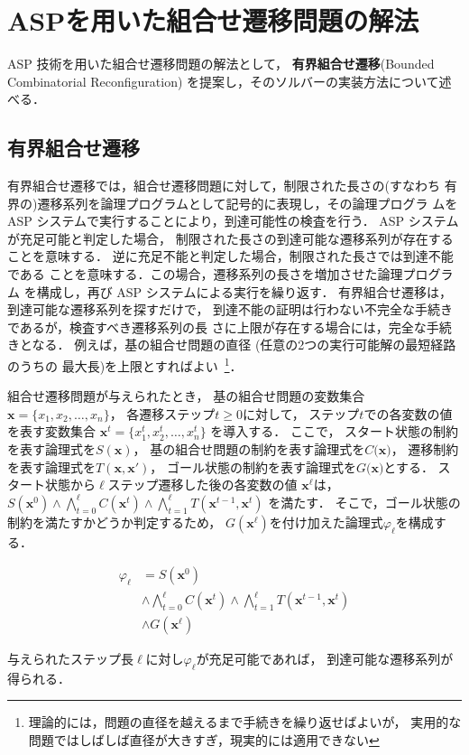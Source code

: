 ﻿%
\section{ASPを用いた組合せ遷移問題の解法}\label{chap:proposal}

ASP 技術を用いた組合せ遷移問題の解法として，
\textbf{有界組合せ遷移}(Bounded Combinatorial Reconfiguration)
を提案し，そのソルバーの実装方法について述べる．

\subsection{有界組合せ遷移}

有界組合せ遷移では，組合せ遷移問題に対して，制限された長さの(すなわち
有界の)遷移系列を論理プログラムとして記号的に表現し，その論理プログラ
ムを ASP システムで実行することにより，到達可能性の検査を行う．
ASP システムが充足可能と判定した場合，
制限された長さの到達可能な遷移系列が存在することを意味する．
逆に充足不能と判定した場合，制限された長さでは到達不能である
ことを意味する．この場合，遷移系列の長さを増加させた論理プログラム
を構成し，再び ASP システムによる実行を繰り返す．
有界組合せ遷移は，到達可能な遷移系列を探すだけで，
到達不能の証明は行わない不完全な手続きであるが，検査すべき遷移系列の長
さに上限が存在する場合には，完全な手続きとなる．
例えば，基の組合せ問題の直径 (任意の2つの実行可能解の最短経路のうちの
最大長)を上限とすればよい~\footnote{%
理論的には，問題の直径を越えるまで手続きを繰り返せばよいが，
実用的な問題ではしばしば直径が大きすぎ，現実的には適用できない}．

組合せ遷移問題が与えられたとき，
基の組合せ問題の変数集合
$\bm{x} = \{x_1,x_2,\ldots,x_n\}$，
各遷移ステップ$t\geq 0$に対して，
ステップ$t$での各変数の値を表す変数集合
$\bm{x}^{t} = \{x_1^t,x_2^t,\ldots,x_n^t\}$
を導入する．
ここで，
スタート状態の制約を表す論理式を$S(\bm{x})$，
基の組合せ問題の制約を表す論理式を$C(\bm{x)}$，
遷移制約を表す論理式を$T(\bm{x},\bm{x}')$，
ゴール状態の制約を表す論理式を$G(\bm{x)}$とする．
スタート状態から$\ell$ステップ遷移した後の各変数の値
$\bm{x}^{\ell}$は，
\(
S(\bm{x}^0) \land 
\bigwedge_{t=0}^{\ell} C(\bm{x}^t) \land
\bigwedge_{t=1}^{\ell} T(\bm{x}^{t-1},\bm{x}^{t})
\)
を満たす．
そこで，ゴール状態の制約を満たすかどうか判定するため，
$G(\bm{x}^\ell)$を付け加えた論理式$\varphi_{\ell}$を構成する．
\begin{adjustvboxheight}
\begin{align*}
  \varphi_{\ell} &= S(\bm{x}^0) \\
  &\land \bigwedge_{t=0}^{\ell} C(\bm{x}^t) 
  \land \bigwedge_{t=1}^{\ell} T(\bm{x}^{t-1},\bm{x}^{t}) \nonumber\\
  &\land G(\bm{x}^\ell)
\end{align*}
\end{adjustvboxheight}
与えられたステップ長$\ell$に対し$\varphi_\ell$が充足可能であれば，
到達可能な遷移系列が得られる．

